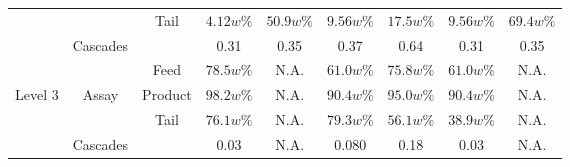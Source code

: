 \begin{table}[htb]
\begin{tabular}{ccccccccc}
        &            & Tail      & $4.12w\%$ & $50.9w\%$ & $9.56w\%$ & $17.5w\%$ & $9.56w\%$ & $69.4w\%$ \\
        & Cascades   &           & 0.31      & 0.35      & 0.37      & 0.64      & 0.31      & 0.35      \\
\midrule                                                                                                 
        &            & Feed      & $78.5w\%$ & N.A.      & $61.0w\%$ & $75.8w\%$ & $61.0w\%$ & N.A.      \\
Level 3 & Assay      & Product   & $98.2w\%$ & N.A.      & $90.4w\%$ & $95.0w\%$ & $90.4w\%$ & N.A.      \\
        &            & Tail      & $76.1w\%$ & N.A.      & $79.3w\%$ & $56.1w\%$ & $38.9w\%$ & N.A.      \\
        & Cascades   &           & 0.03      & N.A.      & 0.080     & 0.18      & 0.03      & N.A.      \\
\bottomrule
\end{tabular}
  \label{tab:level}
\end{table}

